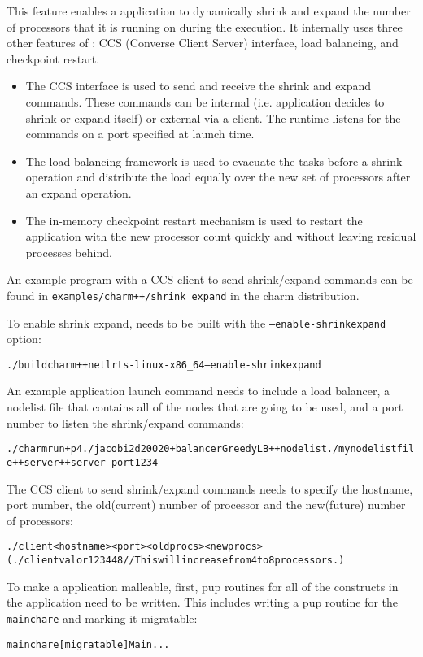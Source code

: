 \experimental{}
This feature enables a \charmpp{} application to dynamically shrink and expand
the number of processors that it is running on during the execution.
It internally uses three other features of \charmpp{}:
CCS (Converse Client Server) interface, load balancing, and checkpoint restart.
\begin{itemize}
\item The CCS interface is used to send and receive the shrink and expand commands.
These commands can be internal (i.e. application decides to shrink or expand
itself) or external via a client. The runtime listens for the commands on
a port specified at launch time.
\item The load balancing framework is used to evacuate the tasks before a shrink
operation and distribute the load equally over the new set of processors
after an expand operation.
\item The in-memory checkpoint restart mechanism is used to restart the application
with the new processor count quickly and without leaving residual processes behind.
\end{itemize}

An example program with a CCS client to send shrink/expand commands
can be found in \texttt{examples/charm++/shrink\_expand}
in the charm distribution.

To enable shrink expand, \charmpp{} needs to be built with the \texttt{--enable-shrinkexpand}
option:
\begin{alltt}
	./build charm++ netlrts-linux-x86_64 --enable-shrinkexpand
\end{alltt}

An example application launch command needs to include a load balancer, a
nodelist file that contains all of the nodes that are going to be used, and a
port number to listen the shrink/expand commands:
\begin{alltt}
	./charmrun +p4 ./jacobi2d 200 20 +balancer GreedyLB ++nodelist ./mynodelistfile ++server ++server-port 1234
\end{alltt}

The CCS client to send shrink/expand commands needs to specify the hostname,
port number, the old(current) number of processor and the new(future) number of
processors:
\begin{alltt}
	./client <hostname> <port> <oldprocs> <newprocs>
	(./client valor 1234 4 8 //This will increase from 4 to 8 processors.)
\end{alltt}

To make a \charm{} application malleable, first, pup routines for
all of the constructs in the application need to be written. This includes
writing a pup routine for the \texttt{mainchare} and marking it migratable:
\begin{alltt}
	mainchare [migratable]  Main { ... }
\end{alltt}

